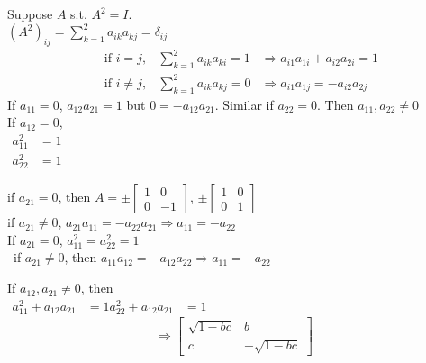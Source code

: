 \documentclass[twoside]{amsart}
\theoremstyle{plain}
\theoremstyle{definition}
\newcommand{\exercisehead}[1]
  {
   \noindent{\small\bf Exercise #1.}
   \smallskip}
\begin{document}
\exercisehead{12} Suppose $A$ s.t. $A^2 = I$. \\
$(A^2)_{ij} = \sum_{k=1}^2 a_{ik} a_{kj} = \delta_{ij}$ 
\[
\begin{aligned}
  & \text{ if } i = j, & \sum_{k=1}^2 a_{ik} a_{ki} = 1 & \Longrightarrow a_{i1} a_{1i} + a_{i2} a_{2i} = 1 \\
  & \text{ if } i \neq j, & \sum_{k=1}^2 a_{ik} a_{kj} = 0 & \Longrightarrow a_{i1} a_{1j} = -a_{i2} a_{2j} 
\end{aligned}
\]
If $a_{11} = 0$, $a_{12}a_{21} = 1$ but $0 = -a_{12} a_{21}$.  Similar if $a_{22} =0$.  Then $a_{11}, a_{22} \neq 0$ \\

If $a_{12} =0$, \\
\phantom{If }$\begin{aligned}
  a_{11}^2 & = 1 \\ 
 a_{22}^2 & = 1 
\end{aligned}$

\phantom{If } if $a_{21} =0 $, then $A = \pm \left[ \begin{matrix} 1 & 0 \\ 0 & -1 \end{matrix} \right]$, $\pm \left[ \begin{matrix} 1 & 0 \\ 0 & 1 \end{matrix} \right]$ \\
\phantom{ If If } if $a_{21} \neq 0$, $a_{21}a_{11} = - a_{22} a_{21} \Longrightarrow a_{11} = -a_{22}$ \\
If $a_{21} =0$, $a_{11}^2 = a_{22}^2 = 1$ \\
\quad \, if $a_{21} \neq 0$, then $a_{11} a_{12} = -a_{12} a_{22} \Longrightarrow a_{11} = - a_{22}$ 

If $a_{12}, a_{21} \neq 0$, then \\
$\begin{aligned}
a_{11}^2 + a_{12}a_{21} &= 1
a_{22}^2 + a_{12}a_{21} &= 1
\end{aligned}$  
\[
\Longrightarrow \left[ \begin{matrix} \sqrt{ 1 - bc} & b \\ c & -\sqrt{ 1 - bc} \end{matrix} \right]
\]
\end{document}
